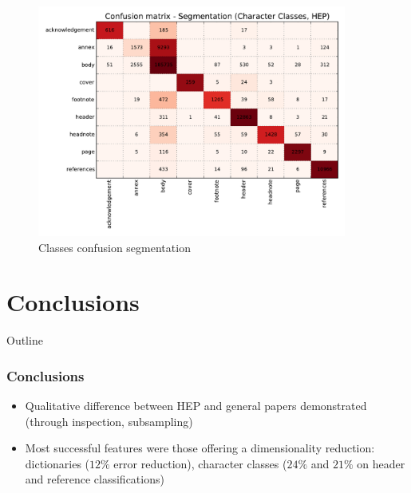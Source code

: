 \documentclass{beamer}
\begin{document}

\begin{frame}
\frametitle{}
\begin{figure}[h]
\center
\includegraphics[width=4in]{Figures/classes_confusion_segmentation.pdf}
\caption{Classes confusion segmentation}
\end{figure}
\end{frame}


\section{Conclusions}


\begin{frame}[noframenumbering]{Outline}
\end{frame}


\begin{frame}
\frametitle{Conclusions}
\begin{itemize}
\item Qualitative difference between HEP and general papers demonstrated (through inspection, subsampling)
\item Most successful features were those offering a dimensionality reduction: dictionaries ($12\%$ error reduction), character classes ($24\%$ and $21\%$ on header and reference classifications)
\end{itemize}
\end{frame}


\end{document}
